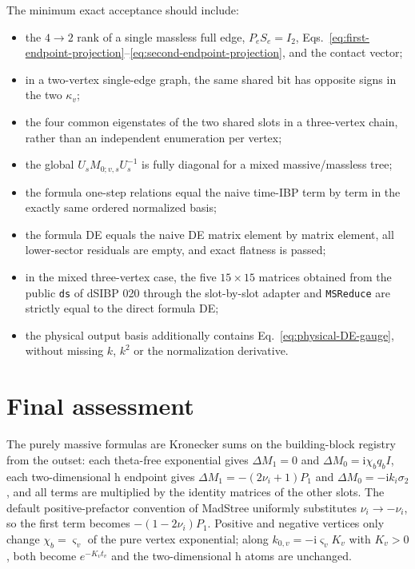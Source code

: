 \documentclass[11pt,a4paper]{article}
\newcommand{\ii}{\mathrm i}
\begin{document}
The minimum exact acceptance should include:
\begin{itemize}
  \item the $4\to2$ rank of a single massless full edge, $P_eS_e=I_2$, Eqs.~\eqref{eq:first-endpoint-projection}--\eqref{eq:second-endpoint-projection}, and the contact vector;
  \item in a two-vertex single-edge graph, the same shared bit has opposite signs in the two $\kappa_v$;
  \item the four common eigenstates of the two shared slots in a three-vertex chain, rather than an independent enumeration per vertex;
  \item the global $U_sM_{0;v,s}U_s^{-1}$ is fully diagonal for a mixed massive/massless tree;
  \item the formula one-step relations equal the naive time-IBP term by term in the exactly same ordered normalized basis;
  \item the formula DE equals the naive DE matrix element by matrix element, all lower-sector residuals are empty, and exact flatness is passed;
  \item in the mixed three-vertex case, the five $15\times15$ matrices obtained from the public \texttt{ds} of dSIBP 020 through the slot-by-slot adapter and \texttt{MSReduce} are strictly equal to the direct formula DE;
  \item the physical output basis additionally contains Eq.~\eqref{eq:physical-DE-gauge}, without missing $k$, $k^2$ or the normalization derivative.
\end{itemize}

\section{Final assessment}

The purely massive formulas are Kronecker sums on the building-block registry from the outset: each theta-free exponential gives $\Delta M_1=0$ and $\Delta M_0=\ii\chi_bq_bI$, each two-dimensional h endpoint gives $\Delta M_1=-(2\nu_i+1)P_1$ and $\Delta M_0=-\ii k_i\sigma_2$, and all terms are multiplied by the identity matrices of the other slots. The default positive-prefactor convention of MadStree uniformly substitutes $\nu_i\to-\nu_i$, so the first term becomes $-(1-2\nu_i)P_1$. Positive and negative vertices only change $\chi_b=\varsigma_v$ of the pure vertex exponential; along $k_{0,v}=-\ii\varsigma_vK_v$ with $K_v>0$, both become $e^{-K_vt_v}$ and the two-dimensional h atoms are unchanged.
\end{document}
